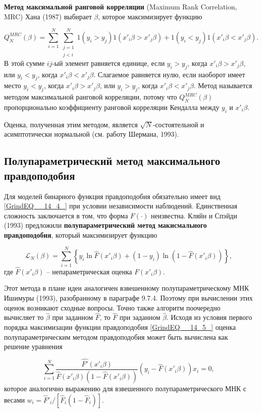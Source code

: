 \textbf{Метод максимальной ранговой корреляции} (Maximum Rank Correlation, MRC) Хана (1987) выбирает $\beta$,  которое максимизирует функцию

\[
Q^{MRC}_N(\beta) = \sum^N_{i=1} \sum^N_{\begin{array}{c} j=1 \\ j < i \end{array}} 
1(y_i > y_j) 1(x'_i\beta > x'_j\beta) + 1(y_i < y_j) 1(x'_i\beta < x'_j\beta).
\] 
В этой сумме $ij$-ый элемент равняется единице,  если $y_i>y_j$,  когда $x'_i\beta > x'_j\beta $,  или $y_i < y_j$,  когда $x'_i\beta < x'_j\beta $.  Слагаемое равняется нулю,  если наоборот имеет место $y_i < y_j$,  когда $x'_i\beta > x'_j\beta $,  или $y_i > y_j$,  когда $x'_i\beta < x'_j\beta $. Метод называется методом максимальной ранговой корреляции,  потому что $Q^{MRC}_N(\beta)$ пропорционально коэффициенту ранговой корреляции Кендалла между $y_i$ и $x'_i\beta $.

Оценка, полученная этим методом, является $\sqrt{N}$-состоятельной и асимптотически нормальной (см. работу Шермана, 1993). 

\subsection{Полупараметрический метод максимального правдоподобия}

Для моделей бинарного  функция правдоподобия обязательно имеет вид \eqref{GrindEQ__14_4_} при условии  независимости наблюдений. Единственная сложность заключается в том,  что форма $F\left(\cdot \right)$ неизвестна. Кляйн и Спэйди (1993) предложили \textbf{полупараметрический метод макисмального правдоподобия},  который максимизирует функцию 

\[
\mathcal{L}_N(\beta) = \sum^N_{i=1} \left\{y_i \ln \hat{F}(x'_i\beta) + (1-y_i) \ln (1-\hat{F}(x'_i\beta)) \right\},
\] 
где $\hat{F}(x'_i\beta)$ -- непараметрическая оценка $F(x'_i\beta)$.

Этот метода в плане идеи аналогичен взвешенному полупараметрическому МНК Ишимуры (1993),  разобранному в параграфе 9.7.4. Поэтому при вычислении этих оценок возникают сходные вопросы. Точно также алгоритм поочередно  вычисляет то $\widehat\beta$ при заданном $\hat{F}$, то $\hat{F}$ при заданном $\widehat\beta.$ Исходя из условия первого порядка максимизации функции правдоподобия \eqref{GrindEQ__14_5_} оценка полупараметрическим методом правдоподобия может быть вычислена как решение уравнения 

\[
\sum^N_{i=1} \frac{\widehat{F'}(x'_i\beta)}{\hat{F}(x'_i\beta)(1-\hat{F}(x'_i\beta))} (y_i-\hat{F}(x'_i\beta))x_i=0, 
\] 
которое аналогично выражению для взвешенного полупараметрического МНК с весами $w_i=\hat{F}'_i/[\hat{F}_i (1-\hat{F}_i)].$

